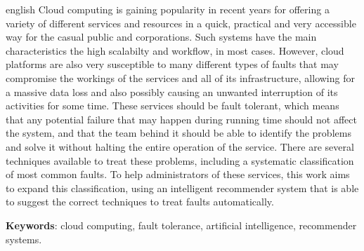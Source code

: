 \documentclass[
	12pt,				%
	a4paper,			%
	english,			%
	french,				%
	spanish,			%
	brazil				%
	]{abntex2}
\newcommand{\listofquadrosname}{Lista de quadros}
\begin{document}
\begin{resumo}[Abstract]
 \begin{otherlanguage*}{english}
   Cloud computing is gaining popularity in recent years for offering a variety of different services and resources in a quick, practical and very accessible way for the casual public and corporations. Such systems have the main characteristics the high scalabilty and workflow, in most cases. However, cloud platforms are also very susceptible to many different types of faults that may compromise the workings of the services and all of its infrastructure, allowing for a massive data loss and also possibly causing an unwanted interruption of its activities for some time. These services should be fault tolerant, which means that any potential failure that may happen during running time should not affect the system, and that the team behind it should be able to identify the problems and solve it without halting the entire operation of the service. There are several techniques available to treat these problems, including a systematic classification of most common faults. To help administrators of these services, this work aims to expand this classification, using an intelligent recommender system that is able to suggest the correct techniques to treat faults automatically.

   \vspace{\onelineskip}
 
   \noindent 
   \textbf{Keywords}: cloud computing, fault tolerance, artificial intelligence, recommender systems.
 \end{otherlanguage*}
\end{resumo}

\listoffigures*
\cleardoublepage

\pdfbookmark[0]{\listofquadrosname}{loq}
\listofquadros*
\cleardoublepage

\listoftables*
\cleardoublepage

\end{document}
